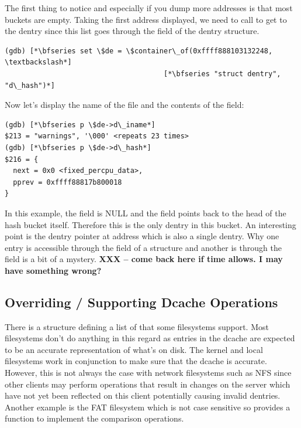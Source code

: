 \noindent
The first thing to notice and especially if you dump more addresses is that most buckets are empty. Taking the first address displayed, we need to call  to get to the dentry since this list goes through the  field of the dentry structure.

\begin{lstlisting}
(gdb) [*\bfseries set \$de = \$container\_of(0xffff888103132248, \textbackslash*]
                                      [*\bfseries "struct dentry", "d\_hash")*]
\end{lstlisting}

\noindent
Now let's display the name of the file and the contents of the  field:         

\begin{lstlisting}
(gdb) [*\bfseries p \$de->d\_iname*]
$213 = "warnings", '\000' <repeats 23 times>
(gdb) [*\bfseries p \$de->d\_hash*]
$216 = {
  next = 0x0 <fixed_percpu_data>,
  pprev = 0xffff88817b800018
}
\end{lstlisting}

\noindent
In this example, the  field is NULL and the  field points back to the head of the hash bucket itself. Therefore this is the only dentry in this bucket. An interesting point is the dentry pointer at address  which is also a single dentry. Why one entry is accessible through the  field of a  structure and another is through the  field is a bit of a mystery. \textbf{XXX -- come back here if time allows. I may have something wrong?}


\subsection{Overriding / Supporting Dcache Operations}

There is a structure defining a list of  that some filesystems support. Most filesystems don't do anything in this regard as entries in the dcache are expected to be an accurate representation of what's on disk. The kernel and local filesystems work in conjunction to make sure that the dcache is accurate.  However, this is not always the case with network filesystems such as NFS since other clients may perform operations that result in changes on the server which have not yet been reflected on this client potentially causing invalid dentries. Another example is the FAT filesystem which is not case sensitive so provides a  function to implement the comparison operations.

